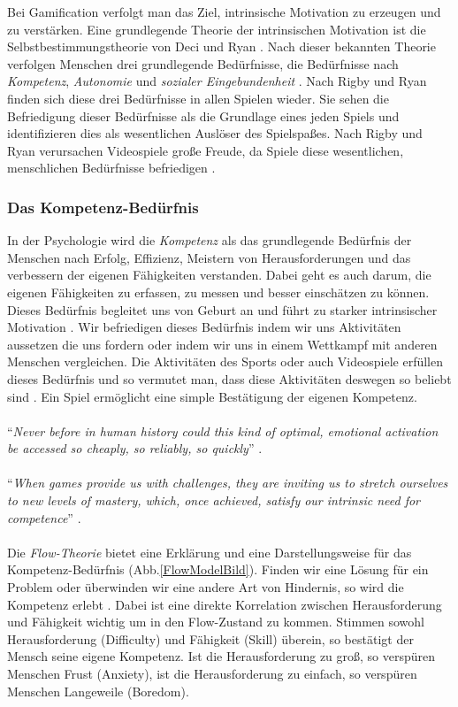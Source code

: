 \documentclass[a4paper,12pt,twoside]{scrartcl}
\begin{document}
Bei Gamification verfolgt man das Ziel, intrinsische Motivation zu erzeugen und zu verstärken. Eine grundlegende Theorie der intrinsischen Motivation ist die Selbstbestimmungstheorie von Deci und Ryan \cite{Ryan2000}. Nach dieser bekannten Theorie verfolgen Menschen drei grundlegende Bedürfnisse, die Bedürfnisse nach \textit{Kompetenz}, \textit{Autonomie} und \textit{sozialer Eingebundenheit} \cite{Rheinberg2006}. Nach Rigby und Ryan \cite{Rigby2011} finden sich diese drei Bedürfnisse in allen Spielen wieder. Sie sehen die Befriedigung dieser Bedürfnisse als die Grundlage eines jeden Spiels und identifizieren dies als wesentlichen Auslöser des Spielspaßes. Nach Rigby und Ryan verursachen Videospiele große Freude, da Spiele diese wesentlichen, menschlichen Bedürfnisse befriedigen \cite{Rigby2011}.

\subsubsection{Das Kompetenz-Bedürfnis}
In der Psychologie wird die \textit{Kompetenz} als das grundlegende Bedürfnis der Menschen nach Erfolg, Effizienz, Meistern von Herausforderungen und das verbessern der eigenen Fähigkeiten verstanden. Dabei geht es auch darum, die eigenen Fähigkeiten zu erfassen, zu messen und besser einschätzen zu können. Dieses Bedürfnis begleitet uns von Geburt an und führt zu starker intrinsischer Motivation \cite{Rigby2011}. Wir befriedigen dieses Bedürfnis indem wir uns Aktivitäten aussetzen die uns fordern oder indem wir uns in einem Wettkampf mit anderen Menschen vergleichen. Die Aktivitäten des Sports oder auch Videospiele erfüllen dieses Bedürfnis und so vermutet man, dass diese Aktivitäten deswegen so beliebt sind \cite{Mcgonigal2011}\cite{Rigby2011}\cite{Mayer2009}. Ein Spiel ermöglicht eine simple Bestätigung der eigenen Kompetenz.
\\\\
\enquote{\textit{Never before in human history could this kind of optimal, emotional activation be accessed so cheaply, so reliably, so quickly}} \cite{Mcgonigal2011}.
\\\\
\enquote{\textit{When games provide us with challenges, they are inviting us to stretch ourselves to new levels of mastery, which, once achieved, satisfy our intrinsic need for competence}} \cite{Rigby2011}. 
\\\\
Die \textit{Flow-Theorie} bietet eine Erklärung und eine Darstellungsweise für das Kompetenz-Bedürfnis (Abb.\ref{FlowModelBild}). Finden wir eine Lösung für ein Problem oder überwinden wir eine andere Art von Hindernis, so wird die Kompetenz erlebt \cite{Csikszentmihalyi2017}. Dabei ist eine direkte Korrelation zwischen Herausforderung und Fähigkeit wichtig um in den Flow-Zustand zu kommen. Stimmen sowohl Herausforderung (Difficulty) und Fähigkeit (Skill) überein, so bestätigt der Mensch seine eigene Kompetenz. Ist die Herausforderung zu groß, so verspüren Menschen Frust (Anxiety), ist die Herausforderung zu einfach, so verspüren Menschen Langeweile (Boredom).
\end{document}
